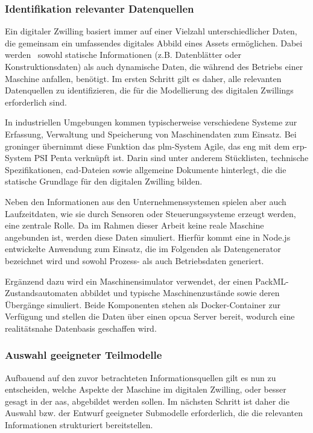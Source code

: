 \subsubsection{Identifikation relevanter Datenquellen}
Ein digitaler Zwilling basiert immer auf einer Vielzahl unterschiedlicher Daten, die gemeinsam ein umfassendes digitales Abbild eines Assets ermöglichen. 
Dabei werden%
\pagebreak 
~sowohl statische Informationen (z.B. Datenblätter oder Konstruktionsdaten) als auch dynamische Daten, die während des Betriebs einer Maschine anfallen, benötigt.
Im ersten Schritt gilt es daher, alle relevanten Datenquellen zu identifizieren, die für die Modellierung des digitalen Zwillings erforderlich sind.

In industriellen Umgebungen kommen typischerweise verschiedene Systeme zur Erfassung, Verwaltung und Speicherung von Maschinendaten zum Einsatz.
Bei groninger übernimmt diese Funktion das \acs{plm}-System Agile, das eng mit dem \acs{erp}-System PSI Penta verknüpft ist.
Darin sind unter anderem Stücklisten, technische Spezifikationen, \acs{cad}-Dateien sowie allgemeine Dokumente hinterlegt, die die statische Grundlage  für den digitalen Zwilling bilden.

Neben den Informationen aus den Unternehmenssystemen spielen aber auch Laufzeitdaten, wie sie durch Sensoren oder Steuerungssysteme erzeugt werden, eine zentrale Rolle.
Da im Rahmen dieser Arbeit keine reale Maschine angebunden ist, werden diese Daten simuliert.
Hierfür kommt eine in Node.js entwickelte Anwendung zum Einsatz, die im Folgenden als Datengenerator bezeichnet wird und sowohl Prozess- als auch Betriebsdaten generiert. 

Ergänzend dazu wird ein Maschinensimulator verwendet, der einen PackML-Zustands\-automaten abbildet und typische Maschinenzustände sowie deren Übergänge simuliert. 
Beide Komponenten stehen als Docker-Container zur Verfügung und stellen die Daten über einen \acs{opcua} Server bereit, wodurch eine realitätsnahe Datenbasis geschaffen wird.
\subsubsection{Auswahl geeigneter Teilmodelle}
Aufbauend auf den zuvor betrachteten Informationsquellen gilt es nun zu entscheiden, welche Aspekte der Maschine im digitalen Zwilling, oder besser gesagt in der \acs{aas}, abgebildet werden sollen.
Im nächsten Schritt ist daher die Auswahl bzw. der Entwurf geeigneter Submodelle erforderlich, die die relevanten Informationen strukturiert bereitstellen.

